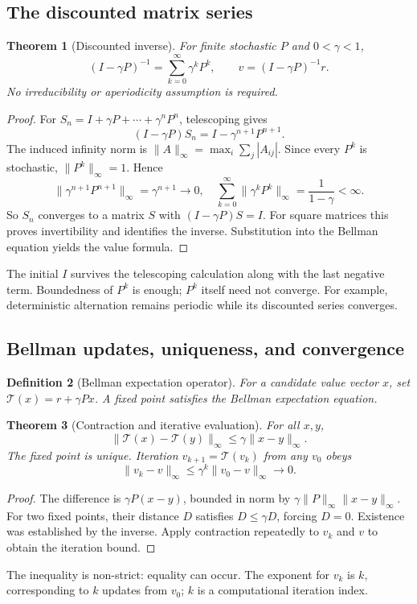 \documentclass[11pt]{article}
\newtheorem{definition}{Definition}[section]
\newtheorem{theorem}[definition]{Theorem}
\theoremstyle{remark}\newtheorem{remark}[definition]{Remark}
\begin{document}
\subsection{The discounted matrix series}
\begin{theorem}[Discounted inverse]
For finite stochastic $P$ and $0<\gamma<1$,
\[
\boxed{(I-\gamma P)^{-1}=\sum_{k=0}^\infty\gamma^kP^k,\qquad
v=(I-\gamma P)^{-1}r.}
\]
No irreducibility or aperiodicity assumption is required.
\end{theorem}
\begin{proof}
For $S_n=I+\gamma P+\cdots+\gamma^nP^n$, telescoping gives
\[
(I-\gamma P)S_n=I-\gamma^{n+1}P^{n+1}.
\]
The induced infinity norm is $\|A\|_\infty=\max_i\sum_j|A_{ij}|$. Since every $P^k$ is stochastic, $\|P^k\|_\infty=1$. Hence
\[
\|\gamma^{n+1}P^{n+1}\|_\infty=\gamma^{n+1}\to0,
\quad \sum_{k=0}^\infty\|\gamma^kP^k\|_\infty=\frac1{1-\gamma}<\infty.
\]
So $S_n$ converges to a matrix $S$ with $(I-\gamma P)S=I$. For square matrices this proves invertibility and identifies the inverse. Substitution into the Bellman equation yields the value formula.
\end{proof}
The initial $I$ survives the telescoping calculation along with the last negative term. Boundedness of $P^k$ is enough; $P^k$ itself need not converge. For example, deterministic alternation remains periodic while its discounted series converges.

\subsection{Bellman updates, uniqueness, and convergence}
\begin{definition}[Bellman expectation operator]
For a candidate value vector $x$, set $\mathcal T(x)=r+\gamma Px$. A fixed point satisfies the Bellman expectation equation.
\end{definition}
\begin{theorem}[Contraction and iterative evaluation]
For all $x,y$,
\[
\|\mathcal T(x)-\mathcal T(y)\|_\infty\leq\gamma\|x-y\|_\infty.
\]
The fixed point is unique. Iteration $v_{k+1}=\mathcal T(v_k)$ from any $v_0$ obeys
\[
\boxed{\|v_k-v\|_\infty\leq\gamma^k\|v_0-v\|_\infty\to0.}
\]
\end{theorem}
\begin{proof}
The difference is $\gamma P(x-y)$, bounded in norm by $\gamma\|P\|_\infty\|x-y\|_\infty$. For two fixed points, their distance $D$ satisfies $D\leq\gamma D$, forcing $D=0$. Existence was established by the inverse. Apply contraction repeatedly to $v_k$ and $v$ to obtain the iteration bound.
\end{proof}
The inequality is non-strict: equality can occur. The exponent for $v_k$ is $k$, corresponding to $k$ updates from $v_0$; $k$ is a computational iteration index.
\end{document}
